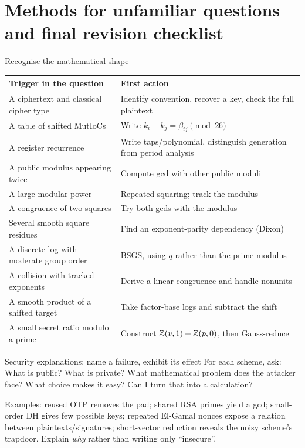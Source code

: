 \documentclass[11pt,a4paper]{article}
\begin{document}
\section{Methods for unfamiliar questions and final revision checklist}
\begin{method}{Recognise the mathematical shape}
\begin{tabular}{p{.30\linewidth}p{.60\linewidth}}\toprule Trigger in the question&First action\\\midrule
A ciphertext and classical cipher type&Identify convention, recover a key, check the full plaintext\\
A table of shifted MutIoCs&Write \(k_i-k_j=\beta_{ij}\pmod{26}\)\\
A register recurrence&Write taps/polynomial, distinguish generation from period analysis\\
A public modulus appearing twice&Compute gcd with other public moduli\\
A large modular power&Repeated squaring; track the modulus\\
A congruence of two squares&Try both gcds with the modulus\\
Several smooth square residues&Find an exponent-parity dependency (Dixon)\\
A discrete log with moderate group order&BSGS, using \(q\) rather than the prime modulus\\
A collision with tracked exponents&Derive a linear congruence and handle nonunits\\
A smooth product of a shifted target&Take factor-base logs and subtract the shift\\
A small secret ratio modulo a prime&Construct \(\mathbb Z(v,1)+\mathbb Z(p,0)\), then Gauss-reduce\\\bottomrule
\end{tabular}
\end{method}
\begin{concept}{Security explanations: name a failure, exhibit its effect}
For each scheme, ask: What is public? What is private? What mathematical problem does the attacker face? What choice makes it easy? Can I turn that into a calculation?

Examples: reused OTP removes the pad; shared RSA primes yield a gcd; small-order DH gives few possible keys; repeated El-Gamal nonces expose a relation between plaintexts/signatures; short-vector reduction reveals the noisy scheme's trapdoor. Explain \emph{why} rather than writing only ``insecure''.
\end{concept}
\end{document}
